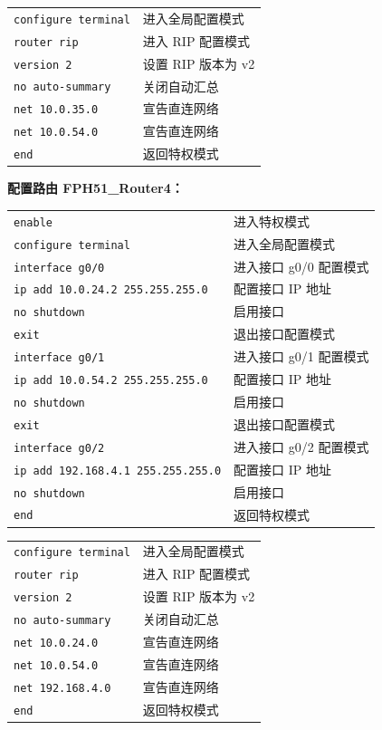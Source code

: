 \documentclass[UTF8,12pt,a4paper]{ctexart}
\begin{document}
\bigskip
\begin{tabular}{p{7cm} p{7cm}}
\texttt{configure terminal} & 进入全局配置模式 \\
\texttt{router rip} & 进入 RIP 配置模式 \\
\texttt{version 2} & 设置 RIP 版本为 v2 \\
\texttt{no auto-summary} & 关闭自动汇总 \\
\texttt{net 10.0.35.0} & 宣告直连网络 \\
\texttt{net 10.0.54.0} & 宣告直连网络 \\
\texttt{end} & 返回特权模式 \\
\end{tabular}

\bigskip
\noindent\textbf{配置路由 FPH51\_Router4：}

\medskip
\begin{tabular}{p{7cm} p{7cm}}
\texttt{enable} & 进入特权模式 \\
\texttt{configure terminal} & 进入全局配置模式 \\

\texttt{interface g0/0} & 进入接口 g0/0 配置模式 \\
\texttt{ip add 10.0.24.2 255.255.255.0} & 配置接口 IP 地址 \\
\texttt{no shutdown} & 启用接口 \\
\texttt{exit} & 退出接口配置模式 \\

\texttt{interface g0/1} & 进入接口 g0/1 配置模式 \\
\texttt{ip add 10.0.54.2 255.255.255.0} & 配置接口 IP 地址 \\
\texttt{no shutdown} & 启用接口 \\
\texttt{exit} & 退出接口配置模式 \\

\texttt{interface g0/2} & 进入接口 g0/2 配置模式 \\
\texttt{ip add 192.168.4.1 255.255.255.0} & 配置接口 IP 地址 \\
\texttt{no shutdown} & 启用接口 \\

\texttt{end} & 返回特权模式 \\
\end{tabular}

\bigskip
\begin{tabular}{p{7cm} p{7cm}}
\texttt{configure terminal} & 进入全局配置模式 \\
\texttt{router rip} & 进入 RIP 配置模式 \\
\texttt{version 2} & 设置 RIP 版本为 v2 \\
\texttt{no auto-summary} & 关闭自动汇总 \\
\texttt{net 10.0.24.0} & 宣告直连网络 \\
\texttt{net 10.0.54.0} & 宣告直连网络 \\
\texttt{net 192.168.4.0} & 宣告直连网络 \\
\texttt{end} & 返回特权模式 \\
\end{tabular}
\end{document}
